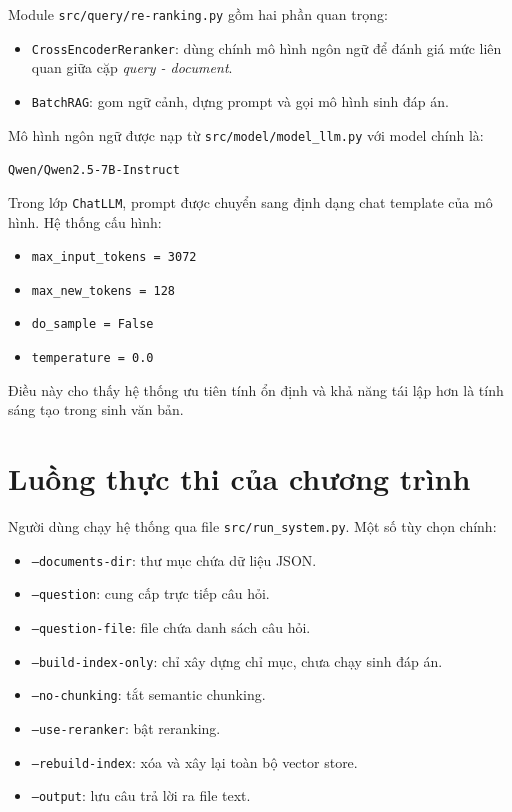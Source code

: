 \documentclass[12pt,a4paper]{article}
\begin{document}
Module \texttt{src/query/re-ranking.py} gồm hai phần quan trọng:
\begin{itemize}[leftmargin=1.5cm]
    \item \texttt{CrossEncoderReranker}: dùng chính mô hình ngôn ngữ để đánh giá mức liên quan giữa cặp \textit{query - document}.
    \item \texttt{BatchRAG}: gom ngữ cảnh, dựng prompt và gọi mô hình sinh đáp án.
\end{itemize}

Mô hình ngôn ngữ được nạp từ \texttt{src/model/model\_llm.py} với model chính là:
\begin{center}
\texttt{Qwen/Qwen2.5-7B-Instruct}
\end{center}

Trong lớp \texttt{ChatLLM}, prompt được chuyển sang định dạng chat template của mô hình. Hệ thống cấu hình:
\begin{itemize}[leftmargin=1.5cm]
    \item \texttt{max\_input\_tokens = 3072}
    \item \texttt{max\_new\_tokens = 128}
    \item \texttt{do\_sample = False}
    \item \texttt{temperature = 0.0}
\end{itemize}

Điều này cho thấy hệ thống ưu tiên tính ổn định và khả năng tái lập hơn là tính sáng tạo trong sinh văn bản.

\section{Luồng thực thi của chương trình}

Người dùng chạy hệ thống qua file \texttt{src/run\_system.py}. Một số tùy chọn chính:
\begin{itemize}[leftmargin=1.5cm]
    \item \texttt{--documents-dir}: thư mục chứa dữ liệu JSON.
    \item \texttt{--question}: cung cấp trực tiếp câu hỏi.
    \item \texttt{--question-file}: file chứa danh sách câu hỏi.
    \item \texttt{--build-index-only}: chỉ xây dựng chỉ mục, chưa chạy sinh đáp án.
    \item \texttt{--no-chunking}: tắt semantic chunking.
    \item \texttt{--use-reranker}: bật reranking.
    \item \texttt{--rebuild-index}: xóa và xây lại toàn bộ vector store.
    \item \texttt{--output}: lưu câu trả lời ra file text.
\end{itemize}
\end{document}
